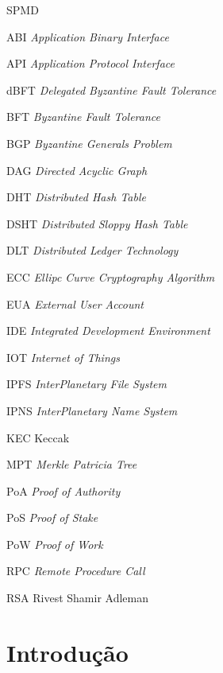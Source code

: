 \documentclass[tcc,capa]{texufpel}
\begin{document}
\listoffigures

\listoftables

\begin{listofabbrv}{SPMD}
    \item[ABI] \textit{Application Binary Interface}
    \item[API] \textit{Application Protocol Interface}
    \item[dBFT] \textit{Delegated Byzantine Fault Tolerance}
    \item[BFT] \textit{Byzantine Fault Tolerance}
    \item[BGP] \textit{Byzantine Generals Problem}
    \item[DAG] \textit{Directed Acyclic Graph}
    \item[DHT] \textit{Distributed Hash Table}
    \item[DSHT] \textit{Distributed Sloppy Hash Table} 
    \item[DLT] \textit{Distributed Ledger Technology}
    \item[ECC] \textit{Ellipc Curve Cryptography Algorithm}
    \item[EUA] \textit{External User Account} 
    \item[IDE] \textit{Integrated Development Environment}
    \item[IOT] \textit{Internet of Things}
    \item[IPFS] \textit{InterPlanetary File System}
    \item[IPNS] \textit{InterPlanetary Name System}
    \item[KEC] Keccak
    \item[MPT]\textit{ Merkle Patricia Tree}
    \item[PoA] \textit{Proof of Authority}
    \item[PoS] \textit{Proof of Stake}
    \item[PoW] \textit{Proof of Work}
    \item[RPC] \textit{Remote Procedure Call}
    \item[RSA] Rivest Shamir Adleman
\end{listofabbrv}

\tableofcontents

\chapter{Introdução}\label{chap:introducao}

    
\end{document}

